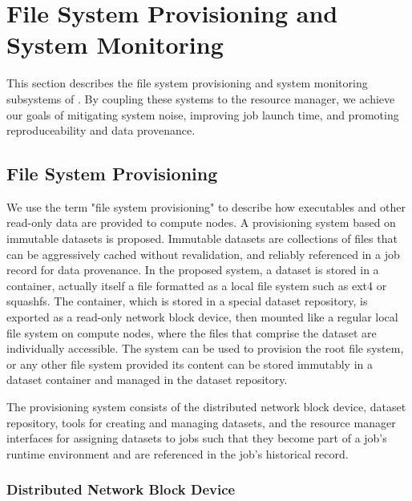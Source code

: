 \section{File System Provisioning and System Monitoring}

This section describes the file system provisioning and system monitoring
subsystems of \ngrm.  By coupling these systems to the resource manager,
we achieve our goals of mitigating system noise, improving job launch time,
and promoting reproduceability and data provenance.

\subsection{File System Provisioning}

We use the term "file system provisioning" to describe how executables
and other read-only data are provided to compute nodes.
A provisioning system based on immutable datasets is proposed.
Immutable datasets are collections of files that can be aggressively cached
without revalidation,
and reliably referenced in a job record for data provenance.
In the proposed system, a dataset is stored in a container,
actually itself a file formatted as a local file system such as ext4 or
squashfs.  The container, which is stored in a special dataset repository,
is exported as a read-only network block device,
then mounted like a regular local file system on compute nodes,
where the files that comprise the dataset are individually accessible.
The system can be used to provision the root file system,
or any other file system provided its content can be stored immutably
in a dataset container and managed in the dataset repository.

The provisioning system consists of the
distributed network block device,
dataset repository,
tools for creating and managing datasets,
and the resource manager interfaces for assigning datasets to jobs
such that they become part of a job's runtime environment and
are referenced in the job's historical record.


\subsubsection{Distributed Network Block Device}

